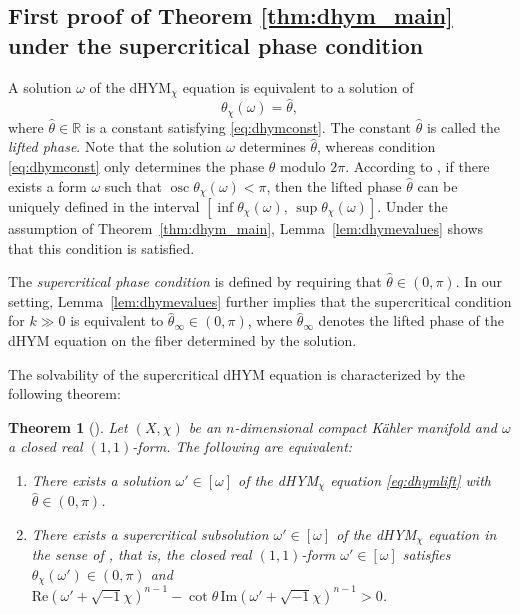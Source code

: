 \documentclass{amsart}
\numberwithin{equation}{section}
\theoremstyle{plain}
\newtheorem{theorem}[equation]{Theorem}
\theoremstyle{definition}
\theoremstyle{remark}
\begin{document}
\subsection{First proof of Theorem \ref{thm:dhym_main} under the supercritical phase condition}\label{sec:dhymfirst}
A solution $\omega$ of the dHYM$_\chi$ equation is equivalent to a solution of  
\begin{equation}\label{eq:dhymlift}
    \theta_\chi(\omega) = \hat{\theta},
\end{equation}
where $\hat{\theta} \in \mathbb{R}$ is a constant satisfying \eqref{eq:dhymconst}.  
The constant $\hat{\theta}$ is called the \emph{lifted phase}.  
Note that the solution $\omega$ determines $\hat{\theta}$, whereas condition \eqref{eq:dhymconst} only determines the phase $\theta$ modulo $2\pi$.  
According to \cite[Definition~2.5]{CXY}, if there exists a form $\omega$ such that $\operatorname{osc}\theta_\chi(\omega) < \pi$,  
then the lifted phase $\hat{\theta}$ can be uniquely defined in the interval $[\inf \theta_\chi(\omega),\, \sup \theta_\chi(\omega)]$.  
Under the assumption of Theorem~\ref{thm:dhym_main}, Lemma~\ref{lem:dhymevalues} shows that this condition is satisfied.  

The \emph{supercritical phase condition} is defined by requiring that $\hat{\theta} \in (0,\pi)$.  
In our setting, Lemma~\ref{lem:dhymevalues} further implies that the supercritical condition for $k \gg 0$  
is equivalent to $\hat{\theta}_\infty \in (0,\pi)$,  
where $\hat{\theta}_\infty$ denotes the lifted phase of the dHYM equation on the fiber determined by the solution.  

The solvability of the supercritical dHYM equation is characterized by the following theorem:
\begin{theorem}[{\cite[Theorem 1.2]{CJY}}]\label{thm:CJY}
    Let $(X,\chi)$ be an $n$-dimensional compact K{\"a}hler manifold and $\omega$ a closed real $(1,1)$-form. 
    The following are equivalent:
    \begin{enumerate}[font=\normalfont]
        \item There exists a solution $\omega'\in[\omega]$ of the dHYM$_\chi$ equation \eqref{eq:dhymlift} with $\hat{\theta}\in (0,\pi)$.
        \item There exists a supercritical subsolution $\omega'\in[\omega]$ of the dHYM$_\chi$ equation in the sense of \cite{CJY}, that is, the closed real $(1,1)$-form $\omega'\in[\omega]$ satisfies $\theta_\chi(\omega')\in(0,\pi)$ and $\mathrm{Re}(\omega'+\sqrt{-1}\chi)^{n-1}-\cot\theta \, \mathrm{Im}(\omega'+\sqrt{-1}\chi)^{n-1}>0$.        
    \end{enumerate}
\end{theorem}
\end{document}
